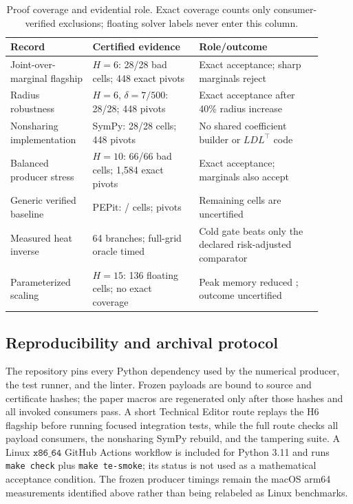 \documentclass[smallextended]{svjour3}
\begin{document}
\begin{table}[htbp]
\centering
\scriptsize
\setlength{\tabcolsep}{4pt}
\caption{Proof coverage and evidential role.  Exact coverage counts only
consumer-verified exclusions; floating solver labels never enter this column.}
\label{tab:proof-coverage}
\begin{tabular}{P{0.23\linewidth}P{0.31\linewidth}P{0.36\linewidth}}
\toprule
Record & Certified evidence & Role/outcome\\
\midrule
Joint-over-marginal flagship & $H=6$: 28/28 bad cells; 448 exact pivots &
Exact acceptance; sharp marginals reject\\
Radius robustness & $H=6$, $\delta=7/500$: 28/28; 448 pivots &
Exact acceptance after 40\% radius increase\\
Nonsharing implementation & SymPy: 28/28 cells; 448 pivots &
No shared coefficient builder or $LDL^\top$ code\\
Balanced producer stress & $H=10$: 66/66 bad cells; 1,584 exact pivots &
Exact acceptance; marginals also accept\\
Generic verified baseline & PEPit: \PepitVerifiedCells{}/\PepitVerifiedAttempted{}
cells; \PepitVerifiedPivots{} pivots & Remaining
\PepitVerifiedUncertified{} cells are uncertified\\
Measured heat inverse & 64 branches; full-grid oracle timed &
Cold gate beats only the declared risk-adjusted comparator\\
Parameterized scaling & $H=15$: 136 floating cells; no exact coverage &
Peak memory reduced \BatchedHfifteenMemoryReduction{}; outcome uncertified\\
\bottomrule
\end{tabular}
\end{table}

\subsection{Reproducibility and archival protocol}

The repository pins every Python dependency used by the numerical producer,
the test runner, and the linter.  Frozen payloads are bound to source and
certificate hashes; the paper macros are regenerated only after those hashes
and all invoked consumers pass.  A short Technical Editor route replays the H6
flagship before running focused integration tests, while the full route checks
all payload consumers, the nonsharing SymPy rebuild, and the tampering suite.  A Linux
$\mathtt{x86\_64}$ GitHub Actions workflow is included for Python 3.11 and runs
\texttt{make check} plus \texttt{make te-smoke}; its status is not used as a
mathematical acceptance condition.  The frozen producer timings remain the
macOS arm64 measurements identified above rather than being relabeled as Linux
benchmarks.
\end{document}
